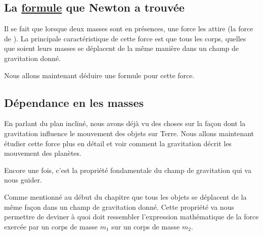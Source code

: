 \subsection{La \href{http://fr.wikipedia.org/wiki/Loi_universelle_de_la_gravitation}{formule} que Newton a trouvée}

Il se fait que lorsque deux masses sont en présences, une force les attire (la force de ). La principale caractéristique de cette force est que tous les corps, quelles que soient leurs masses se déplacent de la même manière dans un champ de gravitation donné.

Nous allons maintenant déduire une formule pour cette force.

\subsection{Dépendance en les masses}


En parlant du plan incliné, nous avons déjà vu des choses sur la façon dont la gravitation influence le mouvement des objets sur Terre. Nous allons maintenant étudier cette force plus en détail et voir comment la gravitation décrit les mouvement des planètes.

Encore une fois, c'est la propriété fondamentale du champ de gravitation qui va nous guider.

\begin{idee}
	Comme mentionné au début du chapitre que tous les objets se déplacent de la même façon dans un champ de gravitation donné. Cette propriété va nous permettre de deviner à quoi doit ressembler l'expression mathématique de la force exercée par un corps de masse $m_1$ sur un corps de masse $m_2$.
\end{idee}

